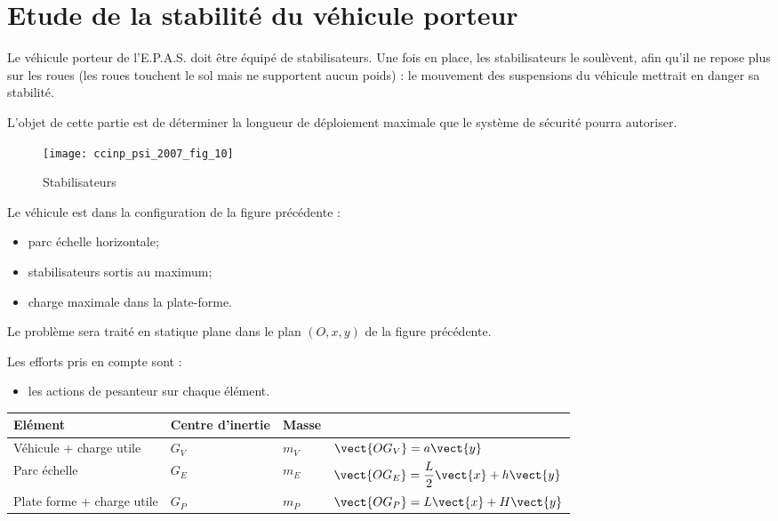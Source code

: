 \section{Etude de la stabilité du véhicule porteur}

 Le véhicule porteur de l’E.P.A.S. doit être équipé de stabilisateurs. Une fois en place, les
 stabilisateurs le soulèvent, afin qu’il ne repose plus sur les roues (les roues touchent le sol mais ne
 supportent aucun poids) : le mouvement des suspensions du véhicule mettrait en danger sa stabilité.
 
 L’objet de cette partie est de déterminer la longueur de déploiement maximale que le système de
 sécurité pourra autoriser.


\begin{figure}[H]
\centering
\texttt{[image: ccinp\_psi\_2007\_fig\_10]}
\caption{\label{ccinp_psi_2007_fig_10} Stabilisateurs}
\end{figure}

 Le véhicule est dans la configuration de la figure précédente :
 \begin{itemize}
\item parc échelle horizontale;
\item stabilisateurs sortis au maximum;
\item charge maximale dans la plate-forme.
\end{itemize}


 Le problème sera traité en statique plane dans le plan $(O, x, y)$ de la figure précédente.
 
  Les efforts pris en compte sont :
  \begin{itemize}
\item les actions de pesanteur sur chaque élément.
 \end{itemize}
 
\begin{center}
\begin{tabular}{llll}
\hline
Elément & Centre d'inertie & Masse &  \\
\hline
Véhicule + charge utile & $G_V$ & $m_V$ & $\vect{OG_V}  = a\vect{y}$ \\
Parc échelle & $G_E$ & $m_E$ & $\vect{OG_E} = \dfrac{L}{2} \vect{x} + h\vect{y}$ \\
Plate forme + charge utile & $G_P$ & $m_P$ & $\vect{OG_P}=L\vect{x}+H\vect{y}$ \\
\hline
\end{tabular}
\end{center}


